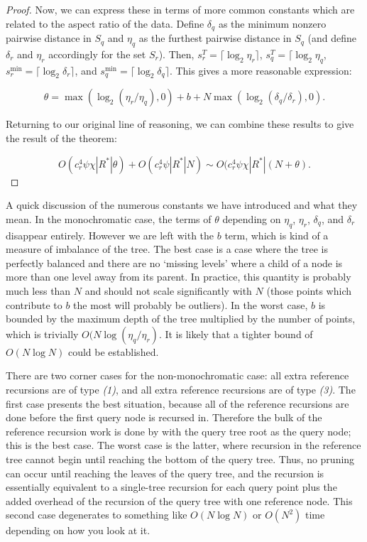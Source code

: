 \begin{proof}
Now, we can express these in terms of more common constants which are related to
the aspect ratio of the data.  Define $\delta_q$ as the minimum nonzero pairwise
distance in $S_q$ and $\eta_q$ as the furthest pairwise distance in $S_q$ (and
define $\delta_r$ and $\eta_r$ accordingly for the set $S_r$).  Then, $s_r^T =
\lceil \log_2 \eta_r \rceil$, $s_q^T = \lceil \log_2 \eta_q$, $s_r^{\min} =
\lceil \log_2 \delta_r \rceil$, and $s_q^{\min} = \lceil \log_2 \delta_q
\rceil$.  This gives a more reasonable expression:

\begin{equation}
\theta = \max(\log_2(\eta_r / \eta_q), 0) + b + N \max(\log_2(\delta_q / \delta_r), 0).
\end{equation}

Returning to our original line of reasoning, we can combine these results to
give the result of the theorem:

\begin{equation}
O(c_r^4 \psi \chi | R^* | \theta) + O(c_r^4 \psi | R^* | N) \sim O(c_r^4 \psi
\chi |R^*| (N + \theta).
\end{equation}
\end{proof}
\vspace*{-0.8em}

A quick discussion of the numerous constants we have introduced and what they
mean.  In the monochromatic case, the terms of $\theta$ depending on $\eta_q$,
$\eta_r$, $\delta_q$, and $\delta_r$ disappear entirely.  However we are left
with the $b$ term, which is kind of a measure of imbalance of the tree.  The
best case is a case where the tree is perfectly balanced and there are no
`missing levels' where a child of a node is more than one level away from its
parent.  In practice, this quantity is probably much less than $N$ and should
not scale significantly with $N$ (those points which contribute to $b$ the most
will probably be outliers).  In the worst case, $b$ is bounded by the maximum
depth of the tree multiplied by the number of points, which is trivially $O(N
\log (\eta_q / \eta_r)$.  It is likely that a tighter bound of $O(N \log N)$
could be established.

There are two corner cases for the non-monochromatic case: all extra reference
recursions are of type \textit{(1)}, and all extra reference recursions are of
type \textit{(3)}.  The first case presents the best situation, because all of
the reference recursions are done before the first query node is recursed in.
Therefore the bulk of the reference recursion work is done by with the query
tree root as the query node; this is the best case.  The worst case is the
latter, where recursion in the reference tree cannot begin until reaching the
bottom of the query tree.  Thus, no pruning can occur until reaching the leaves
of the query tree, and the recursion is essentially equivalent to a single-tree
recursion for each query point plus the added overhead of the recursion of the
query tree with one reference node.  This second case degenerates to something
like $O(N \log N)$ or $O(N^2)$ time depending on how you look at it.

